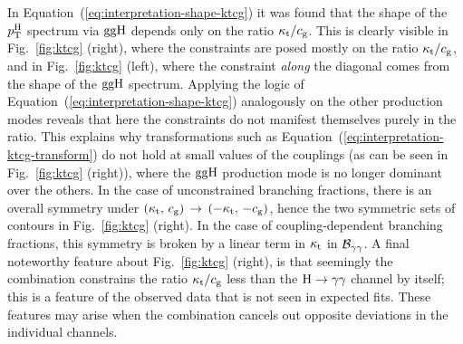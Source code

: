 In Equation~(\ref{eq:interpretation-shape-ktcg}) it was found that the shape of the $p_\mathrm{T}^\mathrm{H}$ spectrum via $\mathrm{g}\mathrm{g}\mathrm{H}$ depends only on the ratio $\kappa_{\mathrm{t}}/c_\mathrm{g}$.
% 
This is clearly visible in Fig.~\ref{fig:ktcg} (right), where the constraints are posed mostly on the ratio $\kappa_{\mathrm{t}} / c_\mathrm{g}$, and in Fig.~\ref{fig:ktcg} (left), where the constraint \emph{along} the diagonal comes from the shape of the $\mathrm{g}\mathrm{g}\mathrm{H}$ spectrum.
% 
Applying the logic of Equation~(\ref{eq:interpretation-shape-ktcg}) analogously on the other production modes reveals that here the constraints do not manifest themselves purely in the ratio.
% 
This explains why transformations such as Equation~(\ref{eq:interpretation-ktcg-transform}) do not hold at small values of the couplings (as can be seen in Fig.~\ref{fig:ktcg} (right)), where the $\mathrm{g}\mathrm{g}\mathrm{H}$ production mode is no longer dominant over the others.
% 
In the case of unconstrained branching fractions, there is an overall symmetry under $(\kappa_{\mathrm{t}},\,c_\mathrm{g}) \, \to \, (-\kappa_{\mathrm{t}},\,-c_\mathrm{g})$, hence the two symmetric sets of contours in Fig.~\ref{fig:ktcg} (right).
% 
In the case of coupling-dependent branching fractions, this symmetry is broken by a linear term in $\kappa_{\mathrm{t}}$ in $\mathcal{B}_{\mathrm{\gamma}\mathrm{\gamma}}$.
% 
A final noteworthy feature about Fig.~\ref{fig:ktcg} (right), is that seemingly the combination constrains the ratio $\kappa_{\mathrm{t}} / c_\mathrm{g}$ less than the $\mathrm{H}\to\mathrm{\gamma}\mathrm{\gamma}$ channel by itself; this is a feature of the observed data that is not seen in expected fits.
% 
These features may arise when the combination cancels out opposite deviations in the individual channels.


